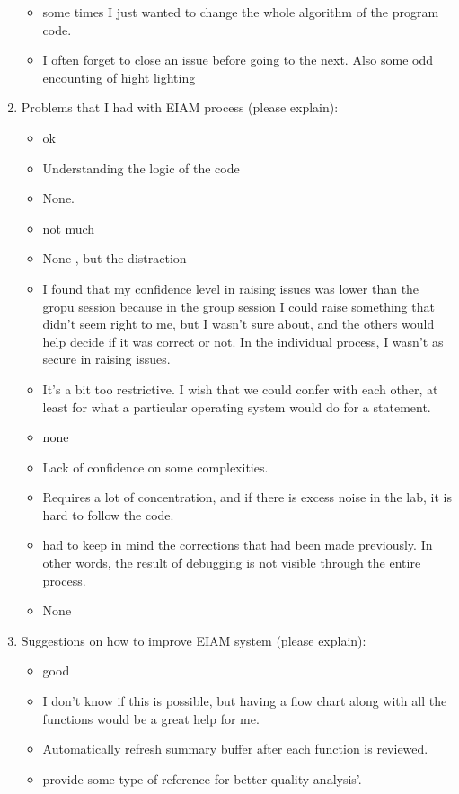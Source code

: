 \begin{enumerate}
\begin{itemize}
\item some times I just wanted to change the whole algorithm of the program
code.
\item I often forget to close an issue before going to the next.  Also some
odd encounting of hight lighting
\end{itemize}


\item  Problems that I had with EIAM process (please explain): 
\begin{itemize}
\item ok
\item Understanding the logic of the code

\item None.
\item not much
\item None , but the distraction
\item I found that my confidence level in raising issues was lower than the
gropu session because in the group session I could raise something
that didn't seem right to me, but I wasn't sure about, and the others
would help decide if it was correct or not.  In the individual
process, I wasn't as secure in raising issues.
\item It's a bit too restrictive.  I wish that we could confer with each
other, at least for what a particular operating system would do for
a statement.
\item none

\item Lack of confidence on some complexities.
\item Requires a lot of concentration, and if there is excess noise in the
lab, it is hard to follow the code.
\item had to keep in mind the corrections that had been made previously. In
other words, the result of debugging is not visible through the entire process.
\item None
\end{itemize}


\item  Suggestions on how to improve EIAM system (please explain):
\begin{itemize}
\item good
\item I don't know if this is possible, but having a flow chart along with
all the functions would be a great help for me.

\item Automatically refresh summary buffer after each function is reviewed.
\item provide some type of reference for better quality analysis'.


\end{itemize}
\end{enumerate}
